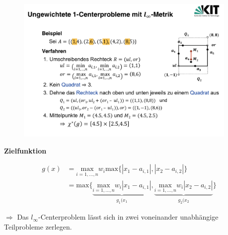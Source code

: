           \begin{exmp}
            
          \end{exmp}

          \begin{figure}[H]
            \centering
            \includegraphics[width=0.95\textwidth]{Images/ungewichtete_1_Centerproblme_mit_l_infty_metrik_Bsp.png}
          \end{figure}


          \par \textbf{Zielfunktion}

          \begin{equation}
            \begin{aligned}
              g(x) &= \underset{i = 1, \dots, n}{\text{max}}w_i\text{max}\{|x_1 - a_{i,1}|, |x_2 - a_{i,2}|\} \\
                   &= \text{max}\{\underbrace{\underset{i = 1,\dots,n}{\text{max}}w_i|x_1 - a_{i,1}|}_{g_1(x_1}, \underbrace{\underset{i = 1,\dots,n}{\text{max}}w_i|x_2 - a_{i,2}|}_{g_2(x_2}\}
            \end{aligned}
          \end{equation}

          \par $\Rightarrow$ Das $l_{\infty}$-Centerproblem lässt sich in zwei voneinander unabhängige Teilprobleme zerlegen.


